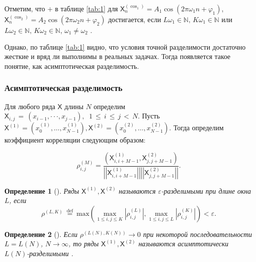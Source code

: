 \documentclass[a4paper, 11pt]{article}
\newcommand{\TS}{\mathsf{X}}
\newtheorem{definition}{Определение} %
\begin{document}
Отметим, что $+$ в таблице \ref{tab:1} для $\TS^{(\cos_1)}_{n} = A_1 \cos\left(2 \pi{\omega_1} n + \varphi_1\right)$,
$\TS^{(\cos_2)}_{n} = A_2 \cos\left(2 \pi{\omega_2} n + \varphi_2\right)$ достигается, если $L\omega_1 \in \mathbb{N}, \, K\omega_1 \in \mathbb{N}$ или $L\omega_2 \in \mathbb{N}, \, K\omega_2 \in \mathbb{N}$, $\omega_1 \not = \omega_2$ \cite{golyandina2001analysis}.

Однако, по таблице \ref{tab:1} видно, что условия точной разделимости достаточно жесткие и вряд ли выполнимы в реальных задачах. Тогда появляется такое понятие, как асимптотическая разделимость.

\subsubsection{Асимптотическая разделимость}

Для любого ряда $\TS$ длины $N$ определим
$\TS_{i,j}\,=\,(x_{i-1},\cdot\cdot\cdot,x_{j-1}),\;\;1\,\leq\,i\,\leq\,j\,<\,N.$
Пусть $\TS^{(1)}=(x_{0}^{(1)},\ldots,x_{N-1}^{(1)}),\TS^{(2)}=(x_{0}^{(2)},\ldots,x_{N-1}^{(2)}).$ Тогда определим коэффициент корреляции следующим образом:


\begin{equation*}
	\rho_{i,j}^{(M)}=\frac{\left(\TS_{i,i+M-1}^{(1)},\TS_{j,j+M-1}^{(2)}\right)}{\left|\left|\TS_{i,i+M-1}^{(1)}\right|\right|\left|\left|\TS_{j,j+M-1}^{(2)}\right|\right|}.
\end{equation*}

\begin{definition}[\cite{golyandina2001analysis}]
	Ряды $\TS^{(1)}, \TS^{(2)}$ называются $\varepsilon$-разделимыми при длине окна $L$, если
	\begin{equation*}
		\rho^{(L,K)}\ {\stackrel{\mathrm{def}}{=}}\ \mathrm{max}\left(\operatorname*{max}_{1\leq i,j\leq K}|\rho_{i,j}^{(L)}|,\operatorname*{max}_{1\leq i,j\leq L}|\rho_{i,j}^{(K)}|\right)<\varepsilon
		\text{.}
	\end{equation*}

\end{definition}

\begin{definition}[\cite{golyandina2001analysis}]
	Если $\rho^{(L(N),K(N))} \rightarrow 0$ при некоторой последовательности $L = L(N) $, $N \rightarrow \infty$, то ряды $\TS^{(1)}, \TS^{(2)}$ называются асимптотически $L(N)$-разделимыми .
\end{definition}
\end{document}
